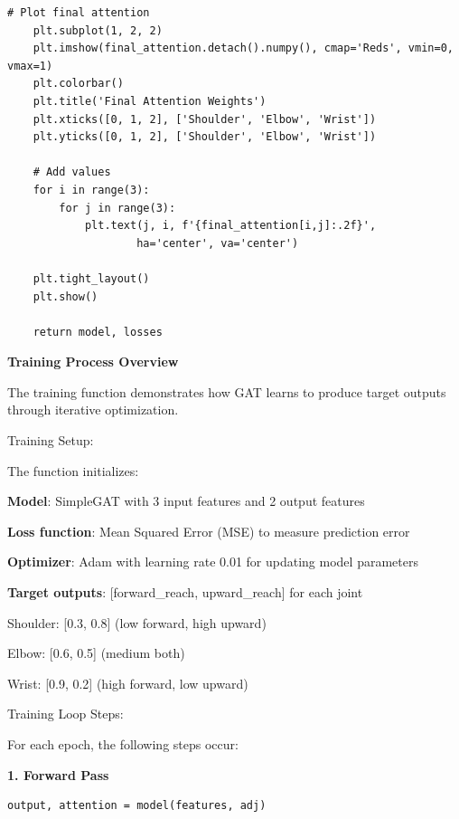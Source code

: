 \begin{lstlisting}[style=pythonstyle,title={Train toy gat function},label={code:train_toy_gat}]
    # Plot final attention
    plt.subplot(1, 2, 2)
    plt.imshow(final_attention.detach().numpy(), cmap='Reds', vmin=0, vmax=1)
    plt.colorbar()
    plt.title('Final Attention Weights')
    plt.xticks([0, 1, 2], ['Shoulder', 'Elbow', 'Wrist'])
    plt.yticks([0, 1, 2], ['Shoulder', 'Elbow', 'Wrist'])
    
    # Add values
    for i in range(3):
        for j in range(3):
            plt.text(j, i, f'{final_attention[i,j]:.2f}', 
                    ha='center', va='center')
    
    plt.tight_layout()
    plt.show()
    
    return model, losses
\end{lstlisting}

\textbf{Training Process Overview}

The training function demonstrates how GAT learns to produce target outputs through iterative optimization.

Training Setup:

The function initializes:

\begin{compactitem}
   \item \textbf{Model}: SimpleGAT with 3 input features and 2 output features
   \item \textbf{Loss function}: Mean Squared Error (MSE) to measure prediction error
   \item \textbf{Optimizer}: Adam with learning rate 0.01 for updating model parameters
   \item \textbf{Target outputs}: [forward\_reach, upward\_reach] for each joint
      \begin{compactitem}
         \item Shoulder: [0.3, 0.8] (low forward, high upward)
         \item Elbow: [0.6, 0.5] (medium both)
         \item Wrist: [0.9, 0.2] (high forward, low upward)
      \end{compactitem}
\end{compactitem}

Training Loop Steps: 

For each epoch, the following steps occur:

\textbf{1. Forward Pass}

\begin{lstlisting}[style=pythonstyle]
output, attention = model(features, adj)
\end{lstlisting}


